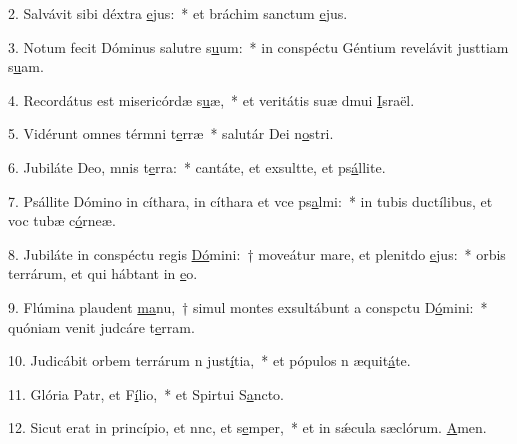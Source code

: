 2. Salvávit sibi déxtra \uline{e}jus:~* et bráchim sanctum \uline{e}jus.\par 
3. Notum fecit Dóminus salutre s\uline{u}um:~* in conspéctu Géntium revelávit justtiam s\uline{u}am.\par 
4. Recordátus est misericórdæ s\uline{u}æ,~* et veritátis suæ dmui \uline{I}sraël.\par 
5. Vidérunt omnes térmni t\uline{e}rræ~* salutár Dei n\uline{o}stri.\par 
6. Jubiláte Deo, mnis t\uline{e}rra:~* cantáte, et exsultte, et ps\uline{á}llite.\par 
7. Psállite Dómino in cíthara, in cíthara et vce ps\uline{a}lmi:~* in tubis ductílibus, et voc tubæ c\uline{ó}rneæ.\par 
8. Jubiláte in conspéctu regis \uline{Dó}mini:~† moveátur mare, et plenitdo \uline{e}jus:~* orbis terrárum, et qui hábtant in \uline{e}o.\par 
9. Flúmina plaudent \uline{ma}nu,~† simul montes exsultábunt a conspctu D\uline{ó}mini:~* quóniam venit judcáre t\uline{e}rram.\par 
10. Judicábit orbem terrárum n just\uline{í}tia,~* et pópulos n æquit\uline{á}te.\par 
11. Glória Patr, et F\uline{í}lio,~* et Spirtui S\uline{a}ncto.\par 
12. Sicut erat in princípio, et nnc, et s\uline{e}mper,~* et in sǽcula sæclórum. \uline{A}men.\par 
